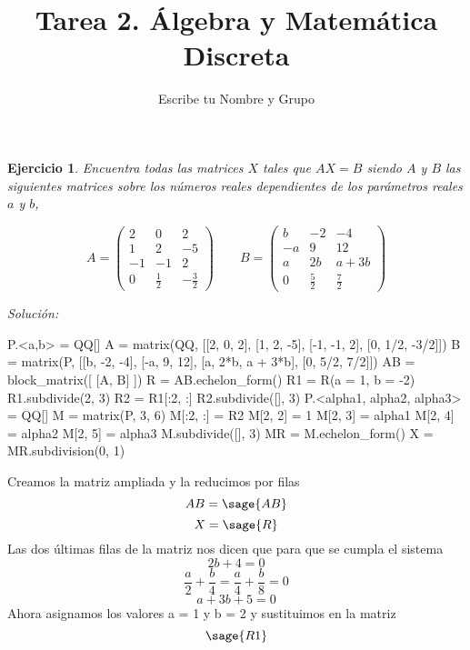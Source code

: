 \documentclass{amsart}
\title{Tarea 2. Álgebra y Matemática Discreta}
\author{Escribe tu Nombre y Grupo}
\newtheorem{ejer}{Ejercicio}
\begin{document}
\maketitle

\begin{ejer}
Encuentra todas las matrices $X$ tales que $AX = B$ siendo $A$ y $B$ las
siguientes matrices sobre los números reales dependientes de los parámetros
reales $a$ y $b$, 

\[
A = \left(\begin{array}{rrr}
2 & 0 & 2 \\
1 & 2 & -5 \\
-1 & -1 & 2 \\
0 & \frac{1}{2} & -\frac{3}{2}
\end{array}\right) \qquad
B = \left(\begin{array}{rrr}
b  & -2 & -4 \\
-a & 9 & 12 \\
a  & 2b & a+3b \\
0 & \frac{5}{2} & \frac{7}{2}
\end{array}\right)
\]
\end{ejer}
{\it Solución: }

\begin{sageblock}
P.<a,b> = QQ[]
A = matrix(QQ, [[2, 0, 2], [1, 2, -5], [-1, -1, 2], [0, 1/2, -3/2]])
B = matrix(P, [[b, -2, -4], [-a, 9, 12], [a, 2*b, a + 3*b], [0, 5/2, 7/2]])
AB = block_matrix([ [A, B] ])
R = AB.echelon_form()
R1 = R(a = 1, b = -2)
R1.subdivide(2, 3)
R2 = R1[:2, :]
R2.subdivide([], 3)
P.<alpha1, alpha2, alpha3> = QQ[]
M = matrix(P, 3, 6)
M[:2, :] = R2
M[2, 2] = 1
M[2, 3] = alpha1
M[2, 4] = alpha2
M[2, 5] = alpha3
M.subdivide([], 3)
MR = M.echelon_form()
X = MR.subdivision(0, 1)
\end{sageblock}

Creamos la matriz ampliada y la reducimos por filas
$$ AB = \sage{AB} $$
$$ X = \sage{R} $$
Las dos últimas filas de la matriz nos dicen que para que se cumpla el sistema
$$ 2b + 4 = 0 $$
$$ \frac{a}{2} + \frac{b}{4} = \frac{a}{4} + \frac{b}{8} = 0 $$
$$ a + 3b + 5 = 0 $$
Ahora asignamos los valores a = 1 y b = 2 y sustituimos en la matriz
$$ \sage{R1} $$
\end{document}
